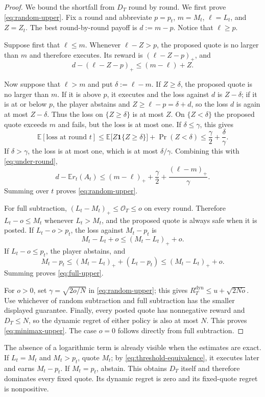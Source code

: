 \documentclass[11pt]{article}
\theoremstyle{remark}
\newcommand{\E}{\mathbb E}
\newcommand{\ind}{\mathbf 1}
\newcommand{\cO}{\mathcal O}
\begin{document}
\begin{proof}
We bound the shortfall from $D_T$ round by round.  We first prove
\eqref{eq:random-upper}.  Fix a round and abbreviate
$p=p_t$, $m=M_t$, $\ell=L_t$, and $Z=Z_t$.  The best round-by-round payoff
is $d:=m-p$.  Notice that $\ell\ge p$.

Suppose first that $\ell\le m$.  Whenever $\ell-Z>p$, the proposed quote is
no larger than $m$ and therefore executes.  Its reward is
$(\ell-Z-p)_+$, and
\begin{equation}\label{eq:under-round}
  d-(\ell-Z-p)_+
  \le (m-\ell)+Z.
\end{equation}

Now suppose that $\ell>m$ and put $\delta:=\ell-m$.  If $Z\ge\delta$, the
proposed quote is no larger than $m$.  If it is above $p$, it executes and the loss
against $d$ is $Z-\delta$; if it is at or below $p$, the player abstains and
$Z\ge \ell-p=\delta+d$, so the loss $d$ is again at most $Z-\delta$.  Thus the
loss on $\{Z\ge\delta\}$ is at most $Z$.  On $\{Z<\delta\}$ the proposed
quote exceeds $m$ and fails, but the loss is at most one.  If
$\delta\le\gamma$, this gives
\[
  \E[\text{loss at round }t]
  \le \E\bigl[Z\ind\{Z\ge\delta\}\bigr]+\Pr(Z<\delta)
  \le \frac\gamma2+\frac\delta\gamma.
\]
If $\delta>\gamma$, the loss is at most one, which is at most
$\delta/\gamma$.  Combining this with \eqref{eq:under-round},
\[
  d-\E r_t(A_t)
  \le
  (m-\ell)_++\frac\gamma2+\frac{(\ell-m)_+}{\gamma}.
\]
Summing over $t$ proves \eqref{eq:random-upper}.

For full subtraction, $(L_t-M_t)_+\le\cO_T\le o$ on every round.  Therefore
$L_t-o\le M_t$ whenever $L_t>M_t$, and the proposed quote is always safe
when it is posted.  If $L_t-o>p_t$, the loss against $M_t-p_t$ is
\[
  M_t-L_t+o\le(M_t-L_t)_++o.
\]
If $L_t-o\le p_t$, the player abstains, and
\[
  M_t-p_t
  \le (M_t-L_t)_++(L_t-p_t)
  \le (M_t-L_t)_++o.
\]
Summing proves \eqref{eq:full-upper}.

For $o>0$, set $\gamma=\sqrt{2o/N}$ in
\eqref{eq:random-upper}; this gives
$R_T^{\mathrm{dyn}}\le u+\sqrt{2No}$.  Use whichever of random subtraction
and full subtraction has the smaller displayed guarantee.  Finally, every posted
quote has nonnegative reward and $D_T\le N$, so the dynamic regret of either
policy is also at most $N$.  This proves \eqref{eq:minimax-upper}.  The case
$o=0$ follows directly from full subtraction.
\end{proof}

The absence of a logarithmic term is already visible when the estimates are
exact.  If $L_t=M_t$ and $M_t>p_t$, quote $M_t$; by
\eqref{eq:threshold-equivalence}, it executes later and earns $M_t-p_t$.
If $M_t=p_t$, abstain.  This obtains $D_T$ itself and therefore dominates
every fixed quote.  Its dynamic regret is zero and its fixed-quote regret is
nonpositive.
\end{document}
